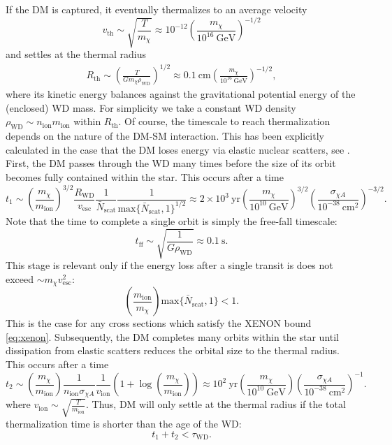 \documentclass[preprintnumbers,amsmath,amssymb,prd,superscriptaddress]{revtex4}
\newcommand{\GeV}{\text{GeV}}
\newcommand{\cm}{\text{cm}}
\def\r{\right)}
\def\l{\left(}
\begin{document}
If the DM is captured, it eventually thermalizes to an average velocity
\begin{equation}
v_\text{th} \sim \sqrt{\frac{T}{m_\chi}} \approx 10^{-12} \l \frac{m_\chi}{10^{16} ~\GeV}\r^{-1/2}
\end{equation}
and settles at the thermal radius
\begin{align}
R_\text{th} \sim \l \frac{T}{G m_\chi \rho_\text{WD}}\r^{1/2} \approx 0.1 ~\cm \l \frac{m_\chi}{10^{16} ~\GeV}\r^{-1/2},
\end{align}
where its kinetic energy balances against the gravitational potential energy of the (enclosed) WD mass. 
For simplicity we take a constant WD density $\rho_\text{WD} \sim n_\text{ion} m_\text{ion}$ within $R_\text{th}$.
Of course, the timescale to reach thermalization depends on the nature of the DM-SM interaction.
This has been explicitly calculated in the case that the DM loses energy via elastic nuclear scatters, see \cite{Tinyakov}. 
First, the DM passes through the WD many times before the size of its orbit becomes fully contained within the star.
This occurs after a time
\begin{equation}
t_1 \sim \l \frac{m_\chi}{m_\text{ion}} \r^{3/2} \frac{R_\text{WD}}{v_\text{esc}} \frac{1}{\bar{N}_\text{scat}} \frac{1}{\text{max}\{\bar{N}_\text{scat}, 1\}^{1/2}} \approx 2 \times 10^{3} ~\text{yr} \l \frac{m_\chi}{10^{10} ~\GeV} \r^{3/2} \l \frac{\sigma_{\chi A}}{10^{-38} ~\cm^2} \r^{-3/2}. 
\end{equation}
Note that the time to complete a single orbit is simply the free-fall timescale:
\begin{equation}
\label{eq:freefalltime}
t_\text{ff} \sim \sqrt{\frac{1}{G \rho_\text{WD}}} \approx 0.1 ~\text{s}.
\end{equation}
This stage is relevant only if the energy loss after a single transit is does not exceed $\sim m_\chi v_\text{esc}^2$:
\begin{equation}
\l \frac{m_\text{ion}}{m_\chi} \r \text{max}\{\bar{N}_\text{scat},1\} < 1. 
\end{equation}
This is the case for any cross sections which satisfy the XENON bound \eqref{eq:xenon}. 
Subsequently, the DM completes many orbits within the star until dissipation from elastic scatters reduces the orbital size to the thermal radius.
This occurs after a time
\begin{equation}
t_2 \sim \l \frac{m_\chi}{m_\text{ion}} \r \frac{1}{n_\text{ion} \sigma_{\chi A}} \frac{1}{v_\text{ion}} \l 1+\log \l \frac{m_\chi}{m_\text{ion}}\r \r \approx 10^2 ~\text{yr} \l \frac{m_\chi}{10^{10} ~\GeV} \r \l \frac{\sigma_{\chi A}}{10^{-38} ~\cm^2} \r^{-1}. 
\end{equation}
where $v_\text{ion} \sim \sqrt{\frac{T}{m_\text{ion}}}$.  
Thus, DM will only settle at the thermal radius if the total thermalization time is shorter than the age of the WD:
\begin{equation}
t_1 + t_2 < \tau_\text{WD}.
\end{equation}
\end{document}
